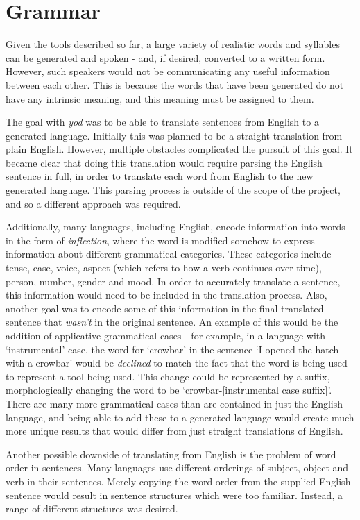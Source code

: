 \documentclass{report}
\begin{document}
	\chapter{Grammar}
	\label{chapter: grammar}
	
	Given the tools described so far, a large variety of realistic words and syllables can be generated and spoken - and, if desired, converted to a written form. However, such speakers would not be communicating any useful information between each other. This is because the words that have been generated do not have any intrinsic meaning, and this meaning must be assigned to them.
	
	The goal with \textit{yod} was to be able to translate sentences from English to a generated language. Initially this was planned to be a straight translation from plain English. However, multiple obstacles complicated the pursuit of this goal. It became clear that doing this translation would require parsing the English sentence in full, in order to translate each word from English to the new generated language. This parsing process is outside of the scope of the project, and so a different approach was required.
	
	Additionally, many languages, including English, encode information into words in the form of \textit{inflection}, where the word is modified somehow to express information about different grammatical categories. These categories include tense, case, voice, aspect (which refers to how a verb continues over time), person, number, gender and mood. In order to accurately translate a sentence, this information would need to be included in the translation process. Also, another goal was to encode some of this information in the final translated sentence that \textit{wasn't} in the original sentence. An example of this would be the addition of applicative grammatical cases - for example, in a language with `instrumental' case, the word for `crowbar' in the sentence `I opened the hatch with a crowbar' would be \textit{declined} to match the fact that the word is being used to represent a tool being used. This change could be represented by a suffix, morphologically changing the word to be `crowbar-[instrumental case suffix]'. There are many more grammatical cases than are contained in just the English language, and being able to add these to a generated language would create much more unique results that would differ from just straight translations of English.
	
	Another possible downside of translating from English is the problem of word order in sentences. Many languages use different orderings of subject, object and verb in their sentences\cite{wals-81}. Merely copying the word order from the supplied English sentence would result in sentence structures which were too familiar. Instead, a range of different structures was desired.
	
\end{document}
